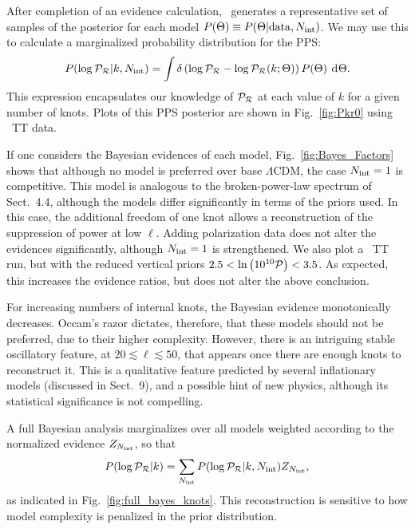 After completion of an evidence calculation, \PolyChord\ generates a representative set of samples of the posterior for each model
$P(\Theta) \equiv P(\Theta|\mathrm{data},N_\mathrm{int})$. We may use this to calculate a marginalized probability distribution
for the PPS\@:
\begin{equation}
  P(\log\mathcal{P}_\mathcal{R}|k,N_\mathrm{int}) = \int \delta\left(\log\mathcal{P}_\mathcal{R} - \log\mathcal{P}_\mathcal{R}(k;\Theta)\right)P(\Theta)\:\operatorname{d}^{}\!{\Theta}.
  \label{eqn:margPR}
\end{equation}
This expression encapsulates our knowledge of $\mathcal{P}_\mathcal{R}$ at each value of $k$ for a given number of knots.
Plots of this PPS posterior are shown in Fig.~\ref{fig:Pkr0} using \Planck\ TT data.



If one considers the Bayesian evidences of each model, Fig.~\ref{fig:Bayes_Factors} shows that although no model is 
preferred over base $\Lambda$CDM, the case $N_\mathrm{int}=1$
is competitive. This model is analogous to the broken-power-law spectrum of
Sect.~4.4,
although the models differ significantly in terms of the priors used. In this case, the
additional freedom of one knot allows a reconstruction of the suppression of power at low $\ell$. Adding polarization data does not alter 
the evidences significantly, although $N_\mathrm{int}=1$ is strengthened. We also plot a \Planck\ TT run,
but with the reduced vertical priors ${2.5<\ln\left(10^{10}\mathcal{P}\right)<3.5}$. 
As expected, this increases the evidence ratios, but does not alter the above conclusion.

For increasing numbers of internal knots, the Bayesian evidence monotonically decreases. Occam's razor dictates,
therefore, that these models should not be preferred, due to their higher complexity. However, there is an
intriguing stable oscillatory feature, at $20\lesssim\ell\lesssim50$, that appears once there are enough knots to reconstruct it.
This is a qualitative feature predicted by several inflationary models (discussed in Sect.~9),
and a possible hint of new physics, although
its statistical significance is not compelling.

A full Bayesian analysis marginalizes over all models weighted according to the normalized evidence $Z_{N_\mathrm{int}}$,
so that
\begin{equation}
  P(\log\mathcal{P}_\mathcal{R}|k) = \sum\limits_{N_\mathrm{int}} P(\log\mathcal{P}_\mathcal{R}|k,N_\mathrm{int}) Z_{N_\mathrm{int}},
  \label{eqn:margPR_full}
\end{equation}
as indicated in Fig.~\ref{fig:full_bayes_knots}.
This reconstruction is sensitive to how model complexity is penalized in the prior distribution. 

